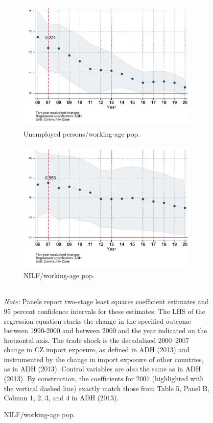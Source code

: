 \documentclass[12pt]{article}
\begin{document}
\begin{figure}
{     \hfill
     \begin{subfigure}[b]{0.45\textwidth}
         \centering
         \caption{Unemployed persons/working-age pop.}
         \includegraphics[width=\textwidth]{results/figures/unempl_decadal_adh13.pdf}
     \end{subfigure}
     \hfill
     \begin{subfigure}[b]{0.45\textwidth}
         \centering
         \caption{NILF/working-age pop.}
         \includegraphics[width=\textwidth]{results/figures/nilf_decadal_adh13.pdf}
     \end{subfigure}}\\
\textit{Note:} Panels report two-stage least squares coefficient estimates and 95 percent confidence intervals for these estimates. The LHS of the regression equation stacks the change in the specified outcome between 1990-2000 and between 2000 and the year indicated on the horizontal axis. The trade shock is the decadalized 2000–2007 change in CZ import exposure, as defined in ADH (2013) and instrumented by the change in import exposure of other countries, as in ADH (2013). Control variables are also the same as in ADH (2013). By construction, the coefficients for 2007 (highlighted with the vertical dashed line) exactly match those from Table 5, Panel B, Column 1, 2, 3, and 4 in ADH (2013).
\end{figure}
\end{document}
